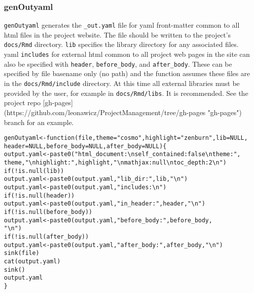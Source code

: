 \documentclass{article}\usepackage[]{graphicx}\usepackage[]{color}
\makeatletter
\newcommand{\hlstr}[1]{\textcolor[rgb]{0.863,0.196,0.184}{#1}}%
\newcommand{\hlopt}[1]{\textcolor[rgb]{0.576,0.631,0.631}{#1}}%
\newcommand{\hlstd}[1]{\textcolor[rgb]{0.514,0.58,0.588}{#1}}%
\newcommand{\hlkwa}[1]{\textcolor[rgb]{0.796,0.294,0.086}{#1}}%
\newcommand{\hlkwb}[1]{\textcolor[rgb]{0.522,0.6,0}{#1}}%
\newcommand{\hlkwc}[1]{\textcolor[rgb]{0.796,0.294,0.086}{#1}}%
\newcommand{\hlkwd}[1]{\textcolor[rgb]{0.576,0.631,0.631}{#1}}%
\newenvironment{kframe}{%
 \def\at@end@of@kframe{}%
 \ifinner\ifhmode%
  \def\at@end@of@kframe{\end{minipage}}%
  \begin{minipage}{\columnwidth}%
 \fi\fi%
 \def\FrameCommand##1{\hskip\@totalleftmargin \hskip-\fboxsep
 \colorbox{shadecolor}{##1}\hskip-\fboxsep
     \hskip-\linewidth \hskip-\@totalleftmargin \hskip\columnwidth}%
 \MakeFramed {\advance\hsize-\width
   \@totalleftmargin\z@ \linewidth\hsize
   \@setminipage}}%
 {\par\unskip\endMakeFramed%
 \at@end@of@kframe}
\newenvironment{knitrout}{}{} %
\makeatother
\begin{document}
\subsubsection{genOutyaml}

\texttt{genOutyaml} generates the \texttt{\_out.yaml} file for yaml front-matter common to all html files in the project website.
The file should be written to the project's \texttt{docs/Rmd} directory.
\texttt{lib} specifies the library directory for any associated files.
yaml \texttt{includes} for external html common to all project web pages in the site can also be specified with \texttt{header}, \texttt{before\_body}, and \texttt{after\_body}.
These can be specified by file basename only (no path) and the function assumes these files are in the \texttt{docs/Rmd/include} directory.
At this time all external libraries must be provided by the user, for example in \texttt{docs/Rmd/libs}.
It is recommended. See the project repo [gh-pages](https://github.com/leonawicz/ProjectManagement/tree/gh-pages "gh-pages") branch for an example.

\begin{knitrout}
\color{fgcolor}\begin{kframe}
\begin{alltt}
\hlstd{genOutyaml} \hlkwb{<-} \hlkwa{function}\hlstd{(}\hlkwc{file}\hlstd{,} \hlkwc{theme} \hlstd{=} \hlstr{"cosmo"}\hlstd{,} \hlkwc{highlight} \hlstd{=} \hlstr{"zenburn"}\hlstd{,} \hlkwc{lib} \hlstd{=} \hlkwa{NULL}\hlstd{,}
    \hlkwc{header} \hlstd{=} \hlkwa{NULL}\hlstd{,} \hlkwc{before_body} \hlstd{=} \hlkwa{NULL}\hlstd{,} \hlkwc{after_body} \hlstd{=} \hlkwa{NULL}\hlstd{) \{}
    \hlstd{output.yaml} \hlkwb{<-} \hlkwd{paste0}\hlstd{(}\hlstr{"html_document:\textbackslash{}n  self_contained: false\textbackslash{}n  theme: "}\hlstd{,}
        \hlstd{theme,} \hlstr{"\textbackslash{}n  highlight: "}\hlstd{, highlight,} \hlstr{"\textbackslash{}n  mathjax: null\textbackslash{}n  toc_depth: 2\textbackslash{}n"}\hlstd{)}
    \hlkwa{if} \hlstd{(}\hlopt{!}\hlkwd{is.null}\hlstd{(lib))}
        \hlstd{output.yaml} \hlkwb{<-} \hlkwd{paste0}\hlstd{(output.yaml,} \hlstr{"  lib_dir: "}\hlstd{, lib,} \hlstr{"\textbackslash{}n"}\hlstd{)}
    \hlstd{output.yaml} \hlkwb{<-} \hlkwd{paste0}\hlstd{(output.yaml,} \hlstr{"  includes:\textbackslash{}n"}\hlstd{)}
    \hlkwa{if} \hlstd{(}\hlopt{!}\hlkwd{is.null}\hlstd{(header))}
        \hlstd{output.yaml} \hlkwb{<-} \hlkwd{paste0}\hlstd{(output.yaml,} \hlstr{"    in_header: "}\hlstd{, header,} \hlstr{"\textbackslash{}n"}\hlstd{)}
    \hlkwa{if} \hlstd{(}\hlopt{!}\hlkwd{is.null}\hlstd{(before_body))}
        \hlstd{output.yaml} \hlkwb{<-} \hlkwd{paste0}\hlstd{(output.yaml,} \hlstr{"    before_body: "}\hlstd{, before_body,}
            \hlstr{"\textbackslash{}n"}\hlstd{)}
    \hlkwa{if} \hlstd{(}\hlopt{!}\hlkwd{is.null}\hlstd{(after_body))}
        \hlstd{output.yaml} \hlkwb{<-} \hlkwd{paste0}\hlstd{(output.yaml,} \hlstr{"    after_body: "}\hlstd{, after_body,} \hlstr{"\textbackslash{}n"}\hlstd{)}
    \hlkwd{sink}\hlstd{(file)}
    \hlkwd{cat}\hlstd{(output.yaml)}
    \hlkwd{sink}\hlstd{()}
    \hlstd{output.yaml}
\hlstd{\}}
\end{alltt}
\end{kframe}
\end{knitrout}
\end{document}
